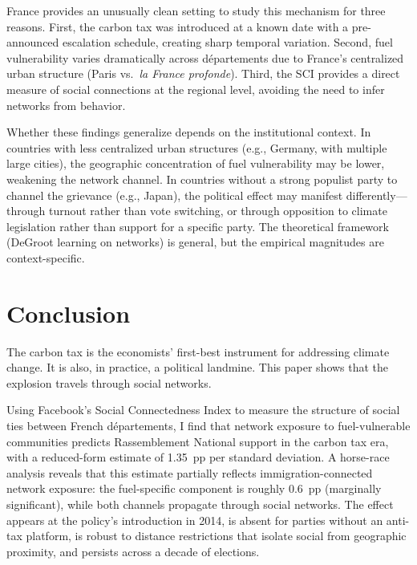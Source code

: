 \documentclass[12pt]{article}
\newcommand{\rn}{Rassemblement National}
\newcommand{\depts}{d\'{e}partements}
\begin{document}
France provides an unusually clean setting to study this mechanism for three reasons. First, the carbon tax was introduced at a known date with a pre-announced escalation schedule, creating sharp temporal variation. Second, fuel vulnerability varies dramatically across \depts{} due to France's centralized urban structure (Paris vs.\ \textit{la France profonde}). Third, the SCI provides a direct measure of social connections at the regional level, avoiding the need to infer networks from behavior.

Whether these findings generalize depends on the institutional context. In countries with less centralized urban structures (e.g., Germany, with multiple large cities), the geographic concentration of fuel vulnerability may be lower, weakening the network channel. In countries without a strong populist party to channel the grievance (e.g., Japan), the political effect may manifest differently---through turnout rather than vote switching, or through opposition to climate legislation rather than support for a specific party. The theoretical framework (DeGroot learning on networks) is general, but the empirical magnitudes are context-specific.



\section{Conclusion}
\label{sec:conclusion}

The carbon tax is the economists' first-best instrument for addressing climate change. It is also, in practice, a political landmine. This paper shows that the explosion travels through social networks.

Using Facebook's Social Connectedness Index to measure the structure of social ties between French \depts{}, I find that network exposure to fuel-vulnerable communities predicts \rn{} support in the carbon tax era, with a reduced-form estimate of 1.35~pp per standard deviation. A horse-race analysis reveals that this estimate partially reflects immigration-connected network exposure: the fuel-specific component is roughly 0.6~pp (marginally significant), while both channels propagate through social networks. The effect appears at the policy's introduction in 2014, is absent for parties without an anti-tax platform, is robust to distance restrictions that isolate social from geographic proximity, and persists across a decade of elections.
\end{document}
